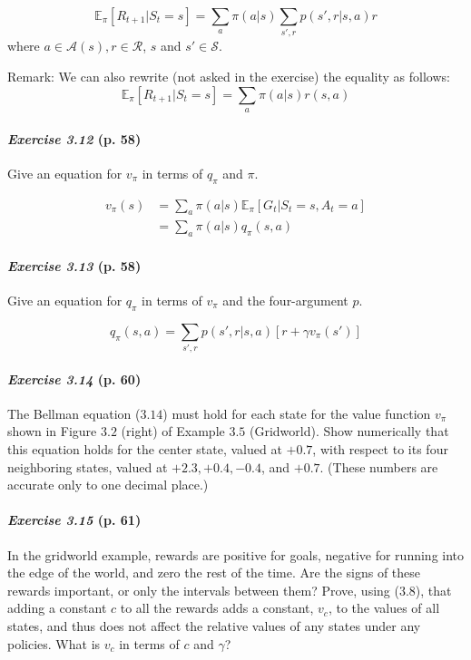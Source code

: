 \documentclass[10pt,a4paper]{article}
\begin{document}
\bigskip
\begin{equation}
\mathbb{E}_\pi[R_{t+1} \lvert S_t=s] = \sum_{a} \pi(a \lvert s) \sum_{s', r} p(s', r \lvert s, a) r
\end{equation}
where $a \in \mathcal{A}(s), r \in \mathcal{R}$, $s$ and $s' \in \mathcal{S}$.

Remark: We can also rewrite (not asked in the exercise) the equality as follows:
\begin{equation}
\mathbb{E}_\pi[R_{t+1} \lvert S_t=s] = \sum_{a} \pi(a \lvert s) r(s, a)
\end{equation}

\paragraph{\textit{Exercise 3.12} (p. 58)} Give an equation for $v_\pi$ in terms of $q_\pi$ and $\pi$.

\bigskip
\begin{equation}
\begin{split}
v_\pi(s) &= \sum_{a} \pi(a \lvert s) \mathbb{E}_\pi[G_t \lvert S_t = s, A_t = a]\\
&= \sum_{a} \pi(a \lvert s) q_\pi(s, a)
\end{split}
\end{equation}

\paragraph{\textit{Exercise 3.13} (p. 58)} Give an equation for $q_\pi$ in terms of $v_\pi$ and the four-argument $p$.

\bigskip
\begin{equation}
q_\pi(s, a) = \sum_{s', r} p(s', r \lvert s, a) \left[r + \gamma v_\pi(s') \right]
\end{equation}

\paragraph{\textit{Exercise 3.14} (p. 60)} The Bellman equation ($3.14$) must hold for each state for the value function $v_\pi$ shown in Figure $3.2$ (right) of Example $3.5$ (Gridworld). Show numerically that this equation holds for the center state, valued at $+0.7$, with respect to its four neighboring states, valued at
$+2.3, +0.4, -0.4$, and $+0.7$. (These numbers are accurate only to one decimal place.)

\paragraph{\textit{Exercise 3.15} (p. 61)} In the gridworld example, rewards are positive for goals, negative for running into the edge of the world, and zero the rest of the time. Are the signs of these rewards important, or only the intervals between them? Prove, using ($3.8$), that adding a
constant $c$ to all the rewards adds a constant, $v_c$, to the values of all states, and thus does not affect the relative values of any states under any policies. What is $v_c$ in terms of $c$ and $\gamma$?
\end{document}
